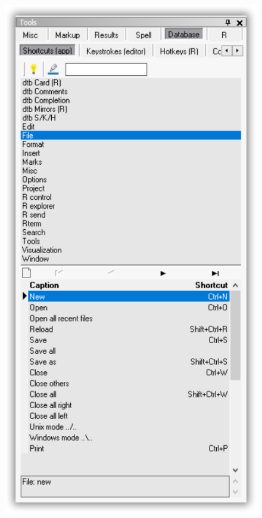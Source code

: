 \begin{figure}[H]
  \includegraphics[scale=0.35]{./res/tools_database_shortcuts.png}~~

\end{figure}
